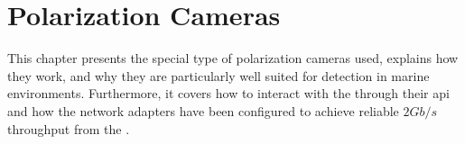 \chapter{Polarization Cameras}
\label{chap:cameras}
This chapter presents the special type of polarization cameras used, explains how they work, and why they are particularly well suited for detection in marine environments.
Furthermore, it covers how to interact with the \cams through their \gls{api} and how the network adapters have been configured to achieve reliable $2Gb/s$ throughput from the \cams.




